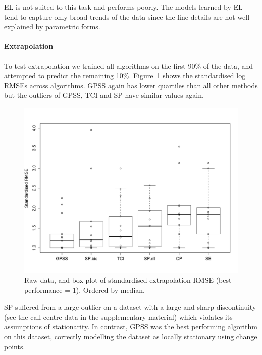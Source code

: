 \documentclass{article}
\begin{document}
EL is not suited to this task and performs poorly.
The models learned by EL tend to capture only broad trends of the data since the fine details are not well explained by parametric forms.

\paragraph{Extrapolation}

To test extrapolation we trained all algorithms on the first 90\% of the data, and attempted to predict the remaining 10\%.
Figure~\ref{fig:box_extrap} shows the standardised log RMSEs across algorithms.
GPSS again has lower quartiles than all other methods but the outliers of GPSS, TCI and SP have similar values again.

\begin{figure}[h]
\centering
\includegraphics[width=\columnwidth]{figures/box_extrap}
\caption{
Raw data, and box plot of standardised extrapolation RMSE (best performance = 1).
Ordered by median.
}
\label{fig:box_extrap}
\end{figure}


SP suffered from a large outlier on a dataset with a large and sharp discontinuity (see the call centre data in the supplementary material) which violates its assumptions of stationarity.
In contrast, GPSS was the best performing algorithm on this dataset, correctly modelling the dataset as locally stationary using change points.
\end{document}
